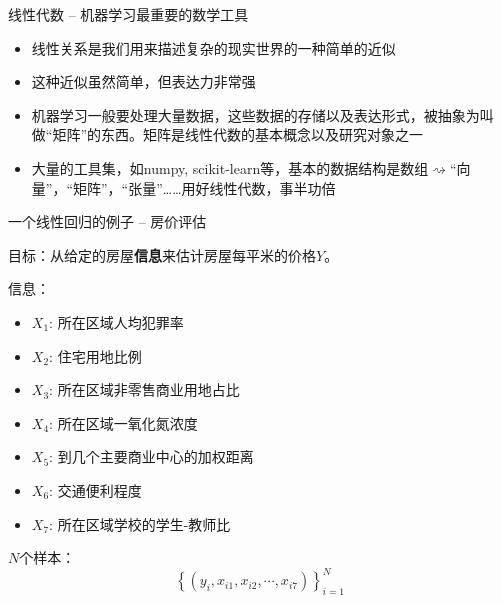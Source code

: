 \begin{frame}{线性代数 -- 机器学习最重要的数学工具}

\begin{itemize}
\item<2-> 线性关系是我们用来描述复杂的现实世界的一种简单的近似
\item<3-> 这种近似虽然简单，但表达力非常强
\item<4-> 机器学习一般要处理大量数据，这些数据的存储以及表达形式，被抽象为叫做``矩阵''的东西。矩阵是线性代数的基本概念以及研究对象之一
\item<5-> 大量的工具集，如numpy, scikit-learn等，基本的数据结构是数组$\rightsquigarrow$``向量''，``矩阵''，``张量''\ldots\ldots 用好线性代数，事半功倍
\end{itemize}

\end{frame}


\begin{frame}{一个线性回归的例子 -- 房价评估}

目标：从给定的房屋{\bfseries 信息}来估计房屋每平米的价格$Y$。

\pause

信息：
\begin{itemize}
\item $X_1$: 所在区域人均犯罪率
\item $X_2$: 住宅用地比例
\item $X_3$: 所在区域非零售商业用地占比
\item $X_4$: 所在区域一氧化氮浓度
\item $X_5$: 到几个主要商业中心的加权距离
\item $X_6$: 交通便利程度
\item $X_7$: 所在区域学校的学生-教师比
\end{itemize}

\pause

$N$个样本：
\[\left\{(y_i, x_{i1}, x_{i2}, \cdots, x_{i7}) \right\}_{i=1}^N\]

\end{frame}


